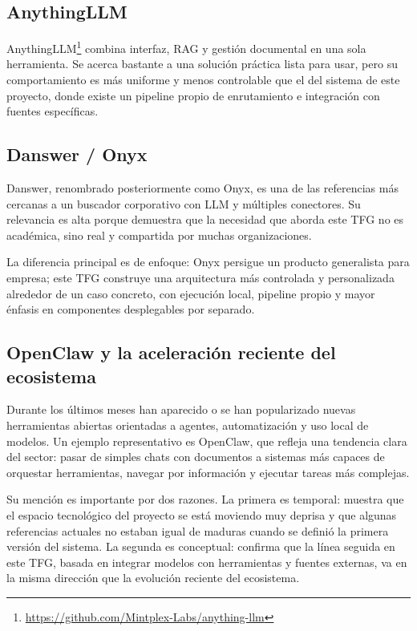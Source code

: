 \subsection{AnythingLLM}

AnythingLLM\footnote{\url{https://github.com/Mintplex-Labs/anything-llm}} combina interfaz, RAG y gestión documental en una sola herramienta. Se acerca bastante a una solución práctica lista para usar, pero su comportamiento es más uniforme y menos controlable que el del sistema de este proyecto, donde existe un pipeline propio de enrutamiento e integración con fuentes específicas.

\subsection{Danswer / Onyx}

Danswer, renombrado posteriormente como Onyx, es una de las referencias más cercanas a un buscador corporativo con LLM y múltiples conectores. Su relevancia es alta porque demuestra que la necesidad que aborda este TFG no es académica, sino real y compartida por muchas organizaciones.

La diferencia principal es de enfoque: Onyx persigue un producto generalista para empresa; este TFG construye una arquitectura más controlada y personalizada alrededor de un caso concreto, con ejecución local, pipeline propio y mayor énfasis en componentes desplegables por separado.

\subsection{OpenClaw y la aceleración reciente del ecosistema}

Durante los últimos meses han aparecido o se han popularizado nuevas herramientas abiertas orientadas a agentes, automatización y uso local de modelos. Un ejemplo representativo es OpenClaw, que refleja una tendencia clara del sector: pasar de simples chats con documentos a sistemas más capaces de orquestar herramientas, navegar por información y ejecutar tareas más complejas.

Su mención es importante por dos razones. La primera es temporal: muestra que el espacio tecnológico del proyecto se está moviendo muy deprisa y que algunas referencias actuales no estaban igual de maduras cuando se definió la primera versión del sistema. La segunda es conceptual: confirma que la línea seguida en este TFG, basada en integrar modelos con herramientas y fuentes externas, va en la misma dirección que la evolución reciente del ecosistema.

